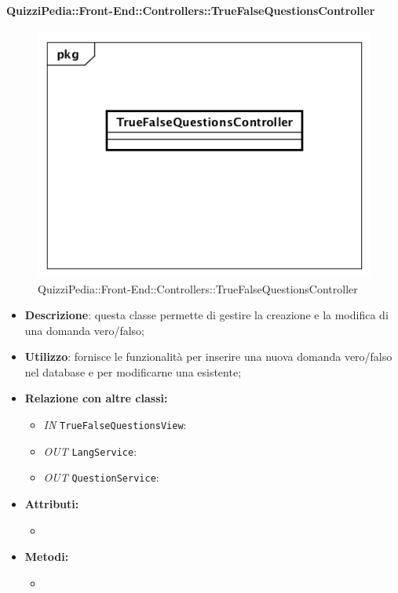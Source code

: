 \paragraph{QuizziPedia::Front-End::Controllers::TrueFalseQuestionsController}
\begin{figure}
	\centering
	\includegraphics[scale=0.45]{UML/Classi/Front-End/QuizziPedia_Front-end_Controller_TrueFalseQuestionsController.png}
	\caption{QuizziPedia::Front-End::Controllers::TrueFalseQuestionsController}
\end{figure}
\begin{itemize}
	\item \textbf{Descrizione}: questa classe permette di gestire la creazione e la modifica di una domanda vero/falso;
	\item \textbf{Utilizzo}: fornisce le funzionalità per inserire una nuova domanda vero/falso nel database e per modificarne una esistente;
	\item \textbf{Relazione con altre classi:}
	\begin{itemize}
		\item \textit{IN} \texttt{TrueFalseQuestionsView}:  
		\item \textit{OUT} \texttt{LangService}: 
		\item \textit{OUT} \texttt{QuestionService}:
	\end{itemize}
	\item \textbf{Attributi:}
	\begin{itemize}
		\item 
	\end{itemize}
	\item \textbf{Metodi:}
	\begin{itemize}
		\item 
	\end{itemize}
\end{itemize}

